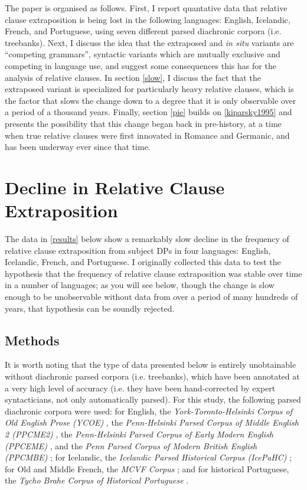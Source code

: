 The paper is organised as follows.
First, I report quantative data that relative clause extraposition is being lost in the following languages: English, Icelandic, French, and Portuguese, using seven different parsed diachronic corpora (i.e. treebanks).
Next, I discuss the idea that the extraposed and \textsl{in situ} variants are ``competing grammars'', syntactic variants which are mutually exclusive and competing in language use, and suggest some consequences this has for the analysis of relative clauses.
In section \ref{slow}, I discuss the fact that the extraposed variant is specialized for particularly heavy relative clauses, which is the factor that slows the change down to a degree that it is only observable over a period of a thousand years.
Finally, section \ref{pie} builds on \ref{kiparsky1995} and presents the possibility that this change began back in pre-history, at a time when true relative clauses were first innovated in Romance and Germanic, and has been underway ever since that time.



\section{Decline in Relative Clause Extraposition}
\label{relclause}

The data in \ref{results} below show a remarkably slow decline in the frequency of relative clause extraposition from subject DPs in four languages: English, Icelandic, French, and Portuguese. I originally collected this data to test the hypothesis that the frequency of relative clause extraposition was stable over time in a number of languages; as you will see below, though the change is slow enough to be unobservable without data from over a period of many hundreds of years, that hypothesis can be soundly rejected.

\subsection{Methods}

It is worth noting that the type of data presented below is entirely unobtainable without diachronic parsed corpora (i.e. treebanks), which have been annotated at a very high level of accuracy (i.e. they have been hand-corrected by expert syntacticians, not only automatically parsed). For this study, the following parsed diachronic corpora were used: for English, the \textsl{York-Toronto-Helsinki Corpus of Old English Prose (YCOE)} \citep{ycoe}, the \textsl{Penn-Helsinki Parsed Corpus of Middle English 2 (PPCME2)} \citep{ppcme2}, the \textsl{Penn-Helsinki Parsed Corpus of Early Modern English (PPCEME)} \citep{ppceme}, and the \textsl{Penn Parsed Corpus of Modern British English (PPCMBE)} \citep{ppcmbe}; for Icelandic, the \textsl{Icelandic Parsed Historical Corpus (IcePaHC)} \citep{icepahc09}; for Old and Middle French, the \textsl{MCVF Corpus} \citep{mcvf}; and for historical Portuguese, the \textsl{Tycho Brahe Corpus of Historical Portuguese} \citep{tychobrahe}.


